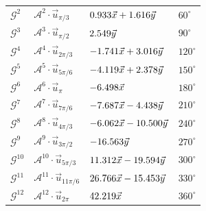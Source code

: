 \begin{workedexample}[Worked example: the powers for $\pb = \pi/4$, $\pi/5$ and $\pi/6$]
\begin{center}
\begin{tabular}{llll}
$\mathcal{G}^2$ & $\mathcal{A}^2 \cdot \vec{u}_{\pi/3}$ & $0.933\vec{x} + 1.616\vec{y}$ & $60^\circ$ \\
$\mathcal{G}^3$ & $\mathcal{A}^3 \cdot \vec{u}_{\pi/2}$ & $2.549\vec{y}$ & $90^\circ$ \\
$\mathcal{G}^4$ & $\mathcal{A}^4 \cdot \vec{u}_{2\pi/3}$ & $-1.741\vec{x} + 3.016\vec{y}$ & $120^\circ$ \\
$\mathcal{G}^5$ & $\mathcal{A}^5 \cdot \vec{u}_{5\pi/6}$ & $-4.119\vec{x} + 2.378\vec{y}$ & $150^\circ$ \\
$\mathcal{G}^6$ & $\mathcal{A}^6 \cdot \vec{u}_{\pi}$ & $-6.498\vec{x}$ & $180^\circ$ \\
$\mathcal{G}^7$ & $\mathcal{A}^7 \cdot \vec{u}_{7\pi/6}$ & $-7.687\vec{x} - 4.438\vec{y}$ & $210^\circ$ \\
$\mathcal{G}^8$ & $\mathcal{A}^8 \cdot \vec{u}_{4\pi/3}$ & $-6.062\vec{x} - 10.500\vec{y}$ & $240^\circ$ \\
$\mathcal{G}^9$ & $\mathcal{A}^9 \cdot \vec{u}_{3\pi/2}$ & $-16.563\vec{y}$ & $270^\circ$ \\
$\mathcal{G}^{10}$ & $\mathcal{A}^{10} \cdot \vec{u}_{5\pi/3}$ & $11.312\vec{x} - 19.594\vec{y}$ & $300^\circ$ \\
$\mathcal{G}^{11}$ & $\mathcal{A}^{11} \cdot \vec{u}_{11\pi/6}$ & $26.766\vec{x} - 15.453\vec{y}$ & $330^\circ$ \\
$\mathcal{G}^{12}$ & $\mathcal{A}^{12} \cdot \vec{u}_{2\pi}$ & $42.219\vec{x}$ & $360^\circ$ \\
\bottomrule
\end{tabular}
\end{center}
\end{workedexample}

